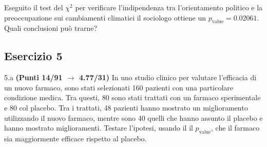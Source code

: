 \documentclass[
  11pt,
]{book}
\theoremstyle{mytheoremstyle}
\theoremstyle{mydefstyle}
\begin{document}
Eseguito il test del \(\chi^2\) per verificare l'indipendenza tra l'orientamento politico e la preoccupazione
sui cambiamenti climatici il sociologo ottiene un \(p_\text{value}=0.02061\). Quali conclusioni può trarne?

\subsection{Esercizio 5}\label{esercizio-5-31}

5.a \textbf{(Punti 14/91 \(\rightarrow\) 4.77/31)} In uno studio clinico per valutare l'efficacia di un nuovo farmaco, sono stati selezionati 160 pazienti con una particolare condizione medica. Tra questi, 80 sono stati trattati con un farmaco sperimentale e 80 col placebo. Tra i trattati, 48 pazienti hanno mostrato un miglioramento utilizzando il nuovo farmaco, mentre sono 40 quelli che hanno assunto il placebo e hanno mostrato miglioramenti. Testare l'ipotesi, usando il il \(p_\text{value}\), che il farmaco sia maggiormente efficace rispetto al placebo.
\end{document}

